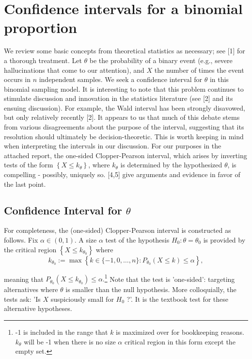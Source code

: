 

\Appendixhead

\section{Confidence intervals for a binomial proportion}

We review some basic concepts from theoretical statistics as necessary; see [1] for a thorough treatment. Let $\theta$ be the probability of a binary event (e.g., severe hallucinations that come to our attention), and $X$ the number of times the event occurs in $n$ independent samples. We seek a confidence interval for $\theta$ in this binomial sampling model. It is interesting to note that this problem continues to stimulate discussion and innovation in the statistics literature (see [2] and its ensuing discussion). For example, the Wald interval has been strongly disavowed, but only relatively recently [2]. It appears to us that much of this debate stems from various disagreements about the purpose of the interval, suggesting that its resolution should ultimately be decision-theoretic. This is worth keeping in mind when interpreting the intervals in our discussion. For our purposes in the attached report, the one-sided Clopper-Pearson interval, which arises by inverting tests of the form $\left\{X \leq k_{\theta}\right\}$, where $k_{\theta}$ is determined by the hypothesized $\theta$, is compelling - possibly, uniquely so. [4,5] give arguments and evidence in favor of the last point.

\subsection{Confidence Interval for $\theta$}

For completeness, the (one-sided) Clopper-Pearson interval is constructed as follows. Fix $\alpha \in(0,1)$. A size $\alpha$ test of the hypothesis $H_{0}: \theta=\theta_{0}$ is provided by the critical region $\left\{X \leq k_{\theta_{0}}\right\}$ where
\begin{equation}\label{eq:1}
k_{\theta_{0}}:=\max \left\{k \in\{-1,0, \ldots, n\}: P_{\theta_{0}}(X \leq k) \leq \alpha\right\}, 
\end{equation}

meaning that $P_{\theta_{0}}\left(X \leq k_{\theta_{0}}\right) \leq \alpha.$\footnote{-1 is included in the range that $k$ is maximized over for bookkeeping reasons. $k_{\theta}$ will be -1 when there is no size $\alpha$ critical region in this form except the empty set.} Note that the test is 'one-sided': targeting alternatives where $\theta$ is smaller than the null hypothesis. More colloquially, the tests ask: 'Is $X$ suspiciously small for $H_{0}$ ?'. It is the textbook test for these alternative hypotheses.

